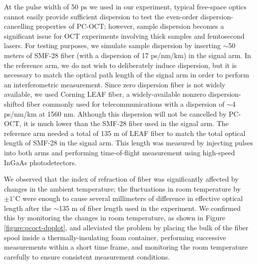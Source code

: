At the pulse width of 50 ps we used in our experiment, typical free-space optics cannot easily provide sufficient dispersion to test the even-order dispersion-cancelling properties of PC-OCT; however, sample dispersion becomes a significant issue for OCT experiments involving thick samples and femtosecond lasers. For testing purposes, we simulate sample dispersion by inserting $\sim$50 meters of SMF-28 fiber (with a dispersion of 17 ps/nm/km) in the signal arm. In the reference arm, we do not wish to deliberately induce dispersion, but it is necessary to match the optical path length of the signal arm in order to perform an interferometric measurement. Since zero dispersion fiber is not widely available, we used Corning LEAF fiber, a widely-available nonzero dispersion-shifted fiber commonly used for telecommunications with a dispersion of $\sim$4 ps/nm/km at 1560 nm. Although this dispersion will not be cancelled by PC-OCT, it is much lower than the SMF-28 fiber used in the signal arm. The reference arm needed a total of 135 m of LEAF fiber to match the total optical length of SMF-28 in the signal arm. This length was measured by injecting pulses into both arms and performing time-of-flight measurement using high-speed InGaAs photodetectors.

We observed that the index of refraction of fiber was significantly affected by changes in the ambient temperature; the fluctuations in room temperature by $\pm 1^\circ$C were enough to cause several millimeters of difference in effective optical length after the $\sim$135 m of fiber length used in the experiment. We confirmed this by monitoring the changes in room temperature, as shown in Figure \ref{figure:pcoct-dpplot}, and alleviated the problem by placing the bulk of the fiber spool inside a thermally-insulating foam container, performing successive measurements within a short time frame, and monitoring the room temperature carefully to ensure consistent measurement conditions.

